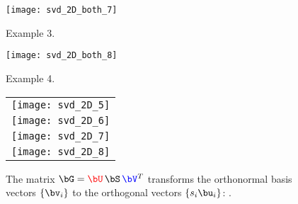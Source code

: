 \documentclass[11pt,titlepage,fleqn]{article}
\begin{document}
\clearpage\pagebreak
\begin{figure}
\hspace{-1cm}
\texttt{[image: svd\_2D\_both\_7]}
\caption[]
{{
Example 3.
\label{fig:ex3}
}}
\end{figure}

\clearpage\pagebreak
\begin{figure}
\hspace{-1cm}
\texttt{[image: svd\_2D\_both\_8]}
\caption[]
{{
Example 4.
\label{fig:ex4}
}}
\end{figure}

\clearpage\pagebreak
\pagestyle{empty}
\begin{figure}
\centering
\begin{tabular}{c}
\texttt{[image: svd\_2D\_5]} \\
\texttt{[image: svd\_2D\_6]} \\
\texttt{[image: svd\_2D\_7]} \\
\texttt{[image: svd\_2D\_8]} 
\end{tabular}
\caption[]
{{
The matrix $\bG = \Ucolor\,\bS\,\Vcolor^T$ transforms the orthonormal basis vectors \textcolor{blue}{$\{\bv_i\}$} to the orthogonal vectors \textcolor{red}{$\{s_i\bu_i\}$}: \makebox{$\bG\Vcolor = \Ucolor\,\bS$}.
\label{fig:2D}
}}
\end{figure}

\end{document}
